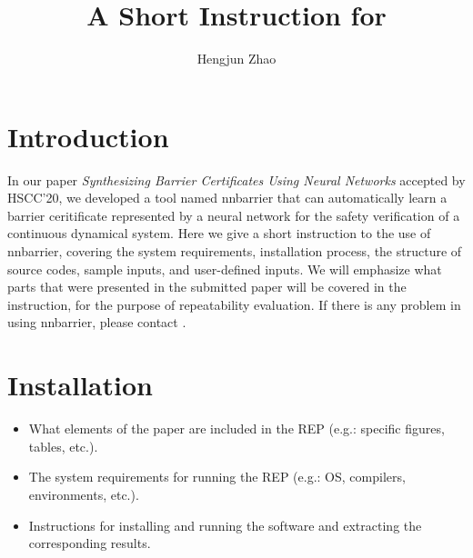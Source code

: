 \documentclass{llncs}
\begin{document}
%
\title{A Short Instruction for }
%
%
\author{Hengjun Zhao}

%
\maketitle %
%
%
%
\section{Introduction}
In our paper \emph{Synthesizing Barrier Certificates Using Neural Networks} accepted by HSCC'20, we developed a tool named \textsf{nnbarrier}
that can automatically learn a barrier ceritificate represented by a neural network for the safety verification of a continuous dynamical system. 
Here we give a short instruction to the use of \textsf{nnbarrier}, covering the system requirements, installation process, the structure of source codes,
sample inputs, and user-defined inputs. We will emphasize what parts that were presented in the submitted paper will be covered in the instruction, for the purpose of repeatability
evaluation. If there is any problem in using \textsf{nnbarrier}, please contact .

\section{Installation}
\begin{itemize}
\item What elements of the paper are included in the REP (e.g.: specific figures, tables, etc.).
\item The system requirements for running the REP (e.g.: OS, compilers, environments, etc.).
\item Instructions for installing and running the software and extracting the corresponding results. 
\end{itemize}
\end{document}
